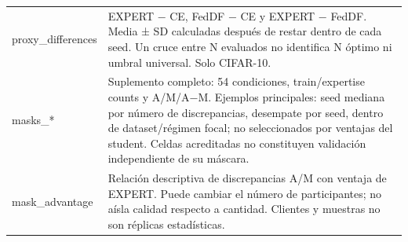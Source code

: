 \begin{tabular}{ll}
proxy\_differences & EXPERT − CE, FedDF − CE y EXPERT − FedDF. Media ± SD calculadas después de restar dentro de cada seed. Un cruce entre N evaluados no identifica N óptimo ni umbral universal. Solo CIFAR-10. \\
masks\_* & Suplemento completo: 54 condiciones, train/expertise counts y A/M/A−M. Ejemplos principales: seed mediana por número de discrepancias, desempate por seed, dentro de dataset/régimen focal; no seleccionados por ventajas del student. Celdas acreditadas no constituyen validación independiente de su máscara. \\
mask\_advantage & Relación descriptiva de discrepancias A/M con ventaja de EXPERT. Puede cambiar el número de participantes; no aísla calidad respecto a cantidad. Clientes y muestras no son réplicas estadísticas. \\
\bottomrule
\end{tabular}
